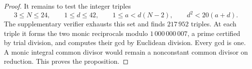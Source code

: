 \begin{proof}
It remains to test the integer triples
\[
 3\le N\le24,\qquad 1\le d\le42,\qquad
 1\le a<d(N-2),\qquad d^2<20(a+d).
\]
The supplementary verifier exhausts this set and finds
\(217\,952\) triples. At each triple it forms the two monic
reciprocals modulo \(1\,000\,000\,007\), a prime certified by
trial division, and computes their gcd by Euclidean division.
Every gcd is one. A monic integral common divisor would remain
a nonconstant common divisor on reduction. This proves the proposition.
\end{proof}
